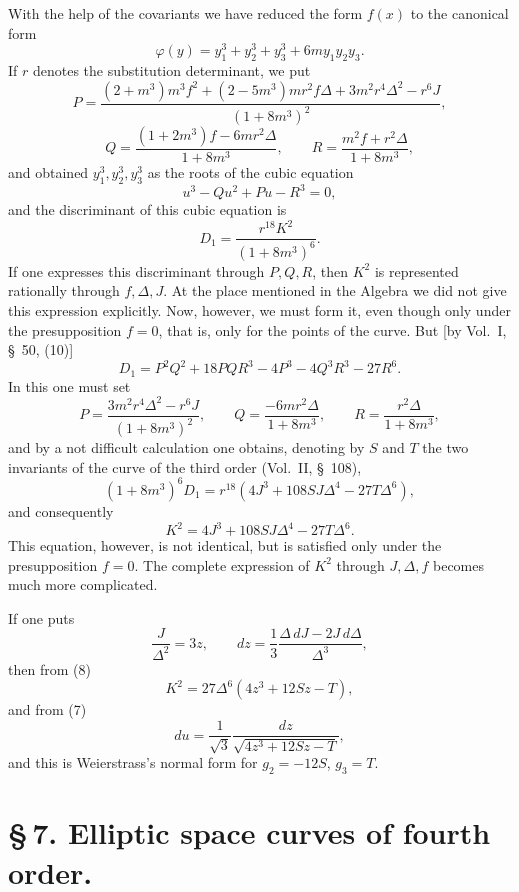 \documentclass[11pt]{article}
\begin{document}
With the help of the covariants we have reduced the form $f(x)$ to the canonical form
\[
\varphi(y)=y_1^3+y_2^3+y_3^3+6my_1y_2y_3.
\]
If $r$ denotes the substitution determinant, we put
\[
P=\frac{(2+m^3)m^3f^2+(2-5m^3)mr^2f\Delta+3m^2r^4\Delta^2-r^6J}{(1+8m^3)^2},
\]
\[
Q=\frac{(1+2m^3)f-6mr^2\Delta}{1+8m^3},\qquad
R=\frac{m^2f+r^2\Delta}{1+8m^3},
\]
and obtained $y_1^3,y_2^3,y_3^3$ as the roots of the cubic equation
\[
u^3-Qu^2+Pu-R^3=0,
\]
and the discriminant of this cubic equation is
\[
D_1=\frac{r^{18}K^2}{(1+8m^3)^6}.
\]
If one expresses this discriminant through $P,Q,R$, then $K^2$ is represented rationally through $f,\Delta,J$. At the place mentioned in the Algebra we did not give this expression explicitly. Now, however, we must form it, even though only under the presupposition $f=0$, that is, only for the points of the curve. But [by Vol.~I, \S~50, (10)]
\[
D_1=P^2Q^2+18PQR^3-4P^3-4Q^3R^3-27R^6.
\]
In this one must set
\[
P=\frac{3m^2r^4\Delta^2-r^6J}{(1+8m^3)^2},\qquad
Q=\frac{-6mr^2\Delta}{1+8m^3},\qquad
R=\frac{r^2\Delta}{1+8m^3},
\]
and by a not difficult calculation one obtains, denoting by $S$ and $T$ the two invariants of the curve of the third order (Vol.~II, \S~108),
\[
(1+8m^3)^6D_1=r^{18}(4J^3+108SJ\Delta^4-27T\Delta^6),
\]
and consequently
\begin{equation}
K^2=4J^3+108SJ\Delta^4-27T\Delta^6.
\tag{8}
\end{equation}
This equation, however, is not identical, but is satisfied only under the presupposition $f=0$. The complete expression of $K^2$ through $J,\Delta,f$ becomes much more complicated.

If one puts
\begin{equation}
\frac{J}{\Delta^2}=3z,
\qquad
 dz=\frac13\frac{\Delta\,dJ-2J\,d\Delta}{\Delta^3},
\tag{9}
\end{equation}
then from (8)
\[
K^2=27\Delta^6(4z^3+12Sz-T),
\]
and from (7)
\begin{equation}
du=\frac1{\sqrt3}\frac{dz}{\sqrt{4z^3+12Sz-T}},
\tag{10}
\end{equation}
and this is Weierstrass's normal form for $g_2=-12S$, $g_3=T$.


\section*{\S\,7. Elliptic space curves of fourth order.}
\end{document}
